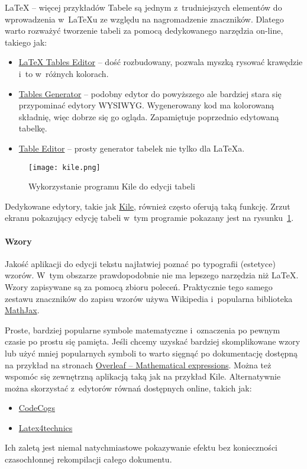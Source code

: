 \begin{easyappendix}{\LaTeX{} -- więcej przykładów}
Tabele są jednym z~trudniejszych elementów do wprowadzenia w~\LaTeX{u} ze względu na nagromadzenie znaczników. Dlatego warto rozważyć tworzenie tabeli za pomocą dedykowanego narzędzia on-line, takiego jak:

\begin{itemize}
	\item \href{https://www.latex-tables.com/}{LaTeX Tables Editor} -- dość rozbudowany, pozwala myszką rysować krawędzie i~to w~różnych kolorach.
	\item \href{https://www.tablesgenerator.com/}{Tables Generator} -- podobny edytor do powyższego ale bardziej stara się przypominać edytory WYSIWYG. Wygenerowany kod ma kolorowaną składnię, więc dobrze się go ogląda. Zapamiętuje poprzednio edytowaną tabelkę.
	\item \href{https://truben.no/table/}{Table Editor} -- prosty generator tabelek nie tylko dla LaTeXa.	
\end{itemize}

\begin{figure}[!ht]
	\centering \texttt{[image: kile.png]} %
	\caption{Wykorzystanie programu Kile do edycji tabeli}
	\label{rys:kile}
\end{figure}

Dedykowane edytory, takie jak \href{https://kile.sourceforge.io/}{Kile}, również często oferują taką funkcję. Zrzut ekranu pokazujący edycję tabeli w~tym programie pokazany jest na rysunku~\ref{rys:kile}.

\paragraph{Wzory}
Jakość aplikacji do edycji tekstu najłatwiej poznać po typografii (estetyce) wzorów. W~tym obszarze prawdopodobnie nie ma lepszego narzędzia niż \LaTeX{}. Wzory zapisywane są za pomocą zbioru poleceń. Praktycznie tego samego zestawu znaczników do zapisu wzorów używa Wikipedia i~popularna biblioteka \href{https://www.mathjax.org/}{MathJax}.

Proste, bardziej popularne symbole matematyczne i~oznaczenia po pewnym czasie po prostu się pamięta. Jeśli chcemy uzyskać bardziej skomplikowane wzory lub użyć mniej popularnych symboli to warto sięgnąć po dokumentację dostępną na przykład na stronach \href{https://www.overleaf.com/learn/latex/Mathematical_expressions}{Overleaf -- Mathematical expressions}. Można też wspomóc się zewnętrzną aplikacją taką jak na przykład Kile. Alternatywnie można skorzystać z~edytorów równań dostępnych online, takich jak:
\begin{itemize}
	\item \href{https://latex.codecogs.com/eqneditor/editor.php}{CodeCogs}
	\item \href{https://www.latex4technics.com/}{Latex4technics}
\end{itemize}
Ich zaletą jest niemal natychmiastowe pokazywanie efektu bez konieczności czasochłonnej rekompilacji całego dokumentu.


\end{easyappendix}
